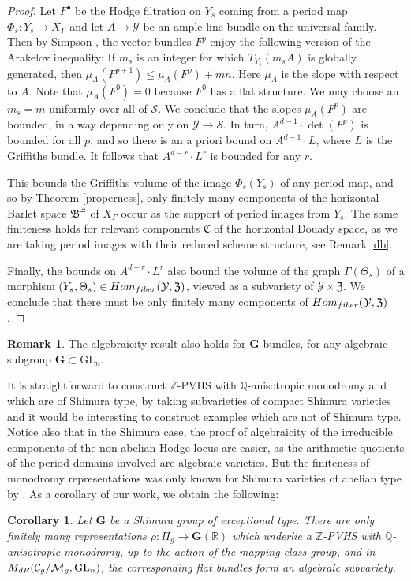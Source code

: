 \documentclass[10pt,letterpaper,english,reqno]{amsart}
\numberwithin{equation}{subsection}
\newcommand\cC{{\mathcal C}}
\newcommand\cM{{\mathcal M}}
\newcommand\cS{{\mathcal S}}
\newcommand\cY{{\mathcal Y}}
\newcommand\fB{{\mathfrak B}}
\newcommand\fC{{\mathfrak C}}
\newcommand\fZ{{\mathfrak Z}}
\newcommand\Q{{\mathbb Q}}
\newcommand\R{{\mathbb R}}
\newcommand\Z{{\mathbb Z}}
\newcommand\bfG{{\mathbf G}}
\DeclareMathOperator{\GL}{GL}
\newtheorem{corollary}[theorem]{Corollary}
\theoremstyle{definition}
\newtheorem{remark}[theorem]{Remark}
\begin{document}
\begin{proof}
Let $F^\bullet$ be 
the Hodge filtration on $Y_s$ coming from a period map 
$\Phi_s\colon Y_s\to X_\Gamma$ and let $A\to \cY$ be an 
ample line bundle on the universal family. 
Then by Simpson
\cite[Lemma 3.3]{simpson-moduli-1},
the vector bundles $F^p$ enjoy the following version
of the Arakelov inequality: 
If $m_s$ is an integer for which $T_{Y_s}(m_sA)$ 
is globally generated, then 
$\mu_A(F^{p+1})\leq \mu_A(F^p)+mn$. 
Here $\mu_A$ is the slope with respect to $A$. 
Note that $\mu_A(F^0)=0$
because $F^0$ has a flat structure.
We may choose an $m_s=m$ uniformly over all of $\cS$.
We conclude that the slopes $\mu_A(F^p)$ are bounded,
in a way depending only on $\cY\to \cS$.
In turn, $A^{d-1}\cdot \det(F^p)$
is bounded for all $p$, and so there is an a priori
bound on $A^{d-1}\cdot L$, where $L$ is the Griffiths bundle. It follows that $A^{d-r}\cdot L^r$ is 
bounded for any $r$.

This bounds the Griffiths volume of the image
$\Phi_s(Y_s)$ of any period map, and so by Theorem \ref{properness}, only finitely many components of the horizontal Barlet space $\fB^{\Xi}$ of $X_\Gamma$ occur as 
the support of period images from $Y_s$. The same
finiteness holds for relevant components $\fC$ of the horizontal
Douady space, as we are taking period images with their
reduced scheme structure, see Remark \ref{db}.

Finally, the bounds on $A^{d-r}\cdot L^r$ also
bound the volume of the graph $\Gamma(\Theta_s)$ of a morphism 
$(Y_s,\Theta_s)\in {\rm Hom}_{\rm fiber}(\cY,\fZ)$, viewed as 
a subvariety of $\cY\times \fZ$. We conclude that there
must be only finitely many components of 
${\rm Hom}_{\rm fiber}(\cY,\fZ)$.
 \end{proof}

\begin{remark}
    The algebraicity result also holds for $\bfG$-bundles, for any algebraic subgroup $\bfG\subset \mathrm{GL}_n$. 
\end{remark}


It is straightforward to construct $\Z$-PVHS with $\Q$-anisotropic monodromy and which are of Shimura type, by taking subvarieties of compact Shimura varieties and it would be interesting to construct examples which are not of Shimura type. Notice also that in the Shimura case, the proof of algebraicity of the irreducible components of the non-abelian Hodge locus are easier, as the arithmetic quotients of the period domains involved are algebraic varieties. But the finiteness of monodromy representations was only known for Shimura varieties of abelian type by \cite{deligne87}. As a corollary of our work, we obtain the following: 


\begin{corollary}
Let $\bfG$ be a Shimura group of exceptional type. There are only finitely many representations $\rho:\Pi_g\rightarrow \bfG(\R)$ which underlie a $\Z$-PVHS with $\Q$-anisotropic monodromy, up to the action of the mapping class group, and in $M_{\rm dR}(\cC_g/\cM_g, \GL_n)$, the corresponding
flat bundles form an algebraic subvariety. 
\end{corollary}





\end{document}
